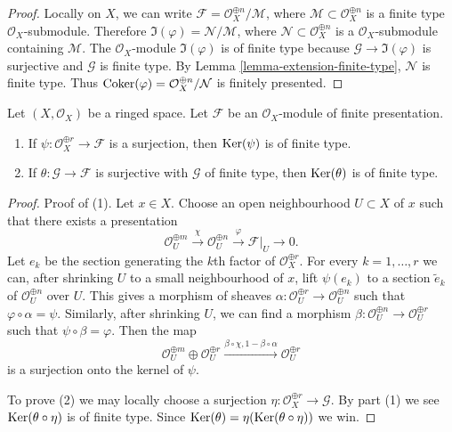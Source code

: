 \begin{proof}
Locally on $X$, we can write
$\mathcal{F} = \mathcal{O}_X^{\oplus n} / \mathcal{M}$, where
$\mathcal{M} \subset \mathcal{O}_X^{\oplus n}$ is a finite type
$\mathcal{O}_X$-submodule. Therefore
$\Im(\varphi) = \mathcal{N} / \mathcal{M}$, where
$\mathcal{N} \subset \mathcal{O}_X^{\oplus n}$ is a
$\mathcal{O}_X$-submodule containing $\mathcal{M}$.
The $\mathcal{O}_X$-module $\Im(\varphi)$ is of finite type
because $\mathcal{G} \to \Im(\varphi)$ is surjective and
$\mathcal{G}$ is finite type. By Lemma \ref{lemma-extension-finite-type},
$\mathcal{N}$ is finite type. Thus
$\mathop{\mathrm{Coker}}(\varphi) = \mathcal{O}_X^{\oplus n} / \mathcal{N}$
is finitely presented.
\end{proof}

\begin{lemma}
\label{lemma-kernel-surjection-finite-free-onto-finite-presentation}
Let $(X, \mathcal{O}_X)$ be a ringed space.
Let $\mathcal{F}$ be an $\mathcal{O}_X$-module of finite presentation.
\begin{enumerate}
\item If $\psi : \mathcal{O}_X^{\oplus r} \to \mathcal{F}$ is a surjection,
then $\mathop{\mathrm{Ker}}(\psi)$ is of finite type.
\item If $\theta : \mathcal{G} \to \mathcal{F}$ is surjective with
$\mathcal{G}$ of finite type, then $\mathop{\mathrm{Ker}}(\theta)$ is of finite type.
\end{enumerate}
\end{lemma}

\begin{proof}
Proof of (1).
Let $x \in X$. Choose an open neighbourhood $U \subset X$ of $x$
such that there exists a presentation
$$
\mathcal{O}_U^{\oplus m}
\xrightarrow{\chi}
\mathcal{O}_U^{\oplus n}
\xrightarrow{\varphi}
\mathcal{F}|_U
\to
0.
$$
Let $e_k$ be the section generating the $k$th factor of
$\mathcal{O}_X^{\oplus r}$. For every $k = 1, \ldots, r$
we can, after shrinking $U$ to a small neighbourhood of $x$,
lift $\psi(e_k)$ to a section $\tilde e_k$ of
$\mathcal{O}_U^{\oplus n}$ over $U$. This gives a morphism
of sheaves $\alpha : \mathcal{O}_U^{\oplus r} \to \mathcal{O}_U^{\oplus n}$
such that $\varphi \circ \alpha = \psi$.
Similarly, after shrinking $U$, we can find a morphism
$\beta : \mathcal{O}_U^{\oplus n} \to \mathcal{O}_U^{\oplus r}$
such that $\psi \circ \beta = \varphi$. Then the map
$$
\mathcal{O}_U^{\oplus m} \oplus
\mathcal{O}_U^{\oplus r}
\xrightarrow{\beta \circ \chi, 1 - \beta \circ \alpha}
\mathcal{O}_U^{\oplus r}
$$
is a surjection onto the kernel of $\psi$.

\medskip\noindent
To prove (2) we may locally choose a surjection
$\eta : \mathcal{O}_X^{\oplus r} \to \mathcal{G}$.
By part (1) we see $\mathop{\mathrm{Ker}}(\theta \circ \eta)$ is of finite type.
Since $\mathop{\mathrm{Ker}}(\theta) = \eta(\mathop{\mathrm{Ker}}(\theta \circ \eta))$ we win.
\end{proof}

